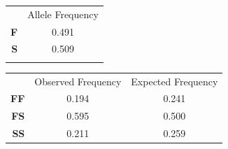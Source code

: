 \begin{solution}
\begin{minipage}{0.3\linewidth}
	\begin{tabular}{rc}
	&	Allele Frequency\\[3ex]
	\Large\textbf{F} & 0.491 \\[3ex]
	\Large\textbf{S} & 0.509 \\[3ex]
	\Large\null	 & \null\\
	\end{tabular}
\end{minipage}\hfill
\begin{minipage}{0.6\linewidth}
	\begin{tabular}{rcc}
		&	Observed Frequency		&	Expected Frequency\\[3ex]
		\large\textbf{FF} & 0.194 & 0.241 \\[3ex]
		\large\textbf{FS} & 0.595 & 0.500 \\[3ex]
		\large\textbf{SS} & 0.211 & 0.259 \\
	\end{tabular}
\end{minipage}
\end{solution}
\newpage